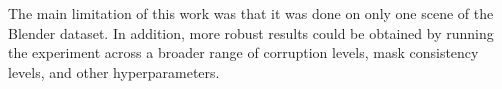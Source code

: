\documentclass[10pt,twocolumn,letterpaper]{article}
\begin{document}
The main limitation of this work was that it was done on only one scene of the Blender dataset. In addition, more robust results could be obtained by running the experiment across a broader range of corruption levels, mask consistency levels, and other hyperparameters.



{\small


}
\end{document}
